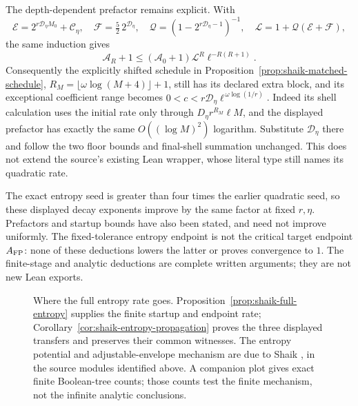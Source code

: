 \documentclass[11pt]{article}
\theoremstyle{remark}\newtheorem{remark}[proposition]{Remark}
\begin{document}
The depth-dependent prefactor remains explicit. With
\[
 \mathcal E=2^{r\mathcal D_\eta M_0}+\mathcal C_\eta,\quad
 \mathcal F=\tfrac52\,2^{\mathcal D_\eta},\quad
 \mathcal Q=(1-2^{r\mathcal D_\eta-1})^{-1},\quad
 \mathcal L=1+\mathcal Q(\mathcal E+\mathcal F),
\]
the same induction gives
\[
 \mathcal A_R+1\le
   (\mathcal A_0+1)\mathcal L^R\ell^{-R(R+1)}.
\]
Consequently the explicitly shifted schedule in
Proposition~\ref{prop:shaik-matched-schedule},
\(R_M=\lfloor\omega\log(M+4)\rfloor+1\),
still has its declared extra block, and its exceptional coefficient
range becomes
\(0<c<r\mathcal D_\eta\ell^{\,\omega\log(1/r)}\).
Indeed its shell calculation uses the initial rate only through
\(D_\eta r^{R_M}\ell M\), and the displayed prefactor has exactly
the same \(O((\log M)^2)\) logarithm. Substitute \(\mathcal D_\eta\)
there and follow the two floor bounds and final-shell summation
unchanged. This does not extend the source's existing Lean wrapper,
whose literal type still names its quadratic rate.

The exact entropy seed is greater than four times the earlier
quadratic seed, so these displayed decay exponents improve by the
same factor at fixed \(r,\eta\). Prefactors and startup bounds have
also been stated, and need not improve uniformly.
The fixed-tolerance entropy endpoint is not the critical target
endpoint \(A_{\rm FP}\): none of these deductions lowers the
latter or proves convergence to \(1\).
The finite-stage and analytic deductions are complete written
arguments; they are not new Lean exports.

\begin{figure}[ht]
\centering
{}
\caption{Where the full entropy rate goes.
Proposition~\ref{prop:shaik-full-entropy} supplies the finite startup
and endpoint rate; Corollary~\ref{cor:shaik-entropy-propagation}
proves the three displayed transfers and preserves their common witnesses.
The entropy potential and adjustable-envelope mechanism are due to
Shaik \cite{Shaik2026v324}, in the source modules identified above.
A companion plot gives exact finite Boolean-tree counts; those counts
test the finite mechanism, not the infinite analytic conclusions.}
\end{figure}
\end{document}
